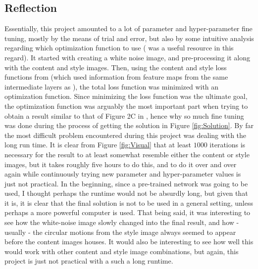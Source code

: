 \documentclass[12pt]{article}
\begin{document}
\subsection{Reflection}
Essentially, this project amounted to a lot of parameter and hyper-parameter fine tuning, mostly by the means of trial and error, but also by some intuitive analysis regarding which optimization function to use (\cite{GD} was a useful resource in this regard). It started with creating a white noise image, and pre-processing it along with the content and style images. Then, using the content and style loss functions from \cite{Github} (which used information from feature maps from the same intermediate layers as \cite{Neural}), the total loss function was minimized with an optimization function. Since minimizing the loss function was the ultimate goal, the optimization function was arguably the most important part when trying to obtain a result similar to that of Figure 2C in \cite{Neural}, hence why so much fine tuning was done during the process of getting the solution in Figure \ref{fig:Solution}. By far the most difficult problem encountered during this project was dealing with the long run time. It is clear from Figure \ref{fig:Visual} that at least $1000$ iterations is necessary for the result to at least somewhat resemble either the content or style images, but it takes roughly five hours to do this, and to do it over and over again while continuously trying new parameter and hyper-parameter values is just not practical. In the beginning, since a pre-trained network was going to be used, I thought perhaps the runtime would not be absurdly long, but given that it is, it is clear that the final solution is not to be used in a general setting, unless perhaps a more powerful computer is used. That being said, it was interesting to see how the white-noise image slowly changed into the final result, and how - usually - the circular motions from the style image always seemed to appear before the content images houses. It would also be interesting to see how well this would work with other content and style image combinations, but again, this project is just not practical with a such a long runtime.
\end{document}
